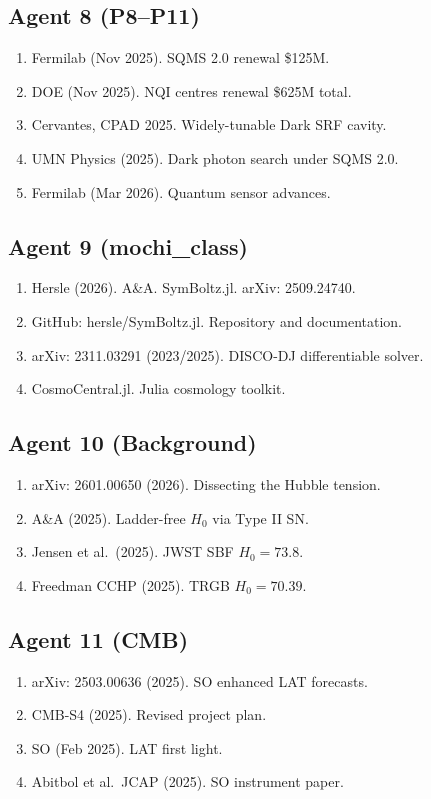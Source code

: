 \documentclass[11pt,a4paper]{article}
\begin{document}
\subsection{Agent 8 (P8--P11)}
\begin{enumerate}
\item Fermilab (Nov 2025). SQMS 2.0 renewal \$125M.
\item DOE (Nov 2025). NQI centres renewal \$625M total.
\item Cervantes, CPAD 2025. Widely-tunable Dark SRF cavity.
\item UMN Physics (2025). Dark photon search under SQMS 2.0.
\item Fermilab (Mar 2026). Quantum sensor advances.
\end{enumerate}

\subsection{Agent 9 (mochi\_class)}
\begin{enumerate}
\item Hersle (2026). A\&A. SymBoltz.jl. arXiv: 2509.24740.
\item GitHub: hersle/SymBoltz.jl. Repository and documentation.
\item arXiv: 2311.03291 (2023/2025). DISCO-DJ differentiable solver.
\item CosmoCentral.jl. Julia cosmology toolkit.
\end{enumerate}

\subsection{Agent 10 (Background)}
\begin{enumerate}
\item arXiv: 2601.00650 (2026). Dissecting the Hubble tension.
\item A\&A (2025). Ladder-free $H_0$ via Type II SN.
\item Jensen et al.\ (2025). JWST SBF $H_0 = 73.8$.
\item Freedman CCHP (2025). TRGB $H_0 = 70.39$.
\end{enumerate}

\subsection{Agent 11 (CMB)}
\begin{enumerate}
\item arXiv: 2503.00636 (2025). SO enhanced LAT forecasts.
\item CMB-S4 (2025). Revised project plan.
\item SO (Feb 2025). LAT first light.
\item Abitbol et al.\ JCAP (2025). SO instrument paper.
\end{enumerate}
\end{document}
